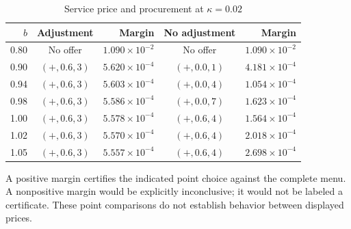 \begin{table}[tbp]
\centering
\caption{Service price and procurement at $\kappa=0.02$}\label{tab:r12_prices}
\begin{tabular}{rcrcr}
\toprule
$b$ & Adjustment & Margin & No adjustment & Margin \\
\midrule
0.80 & No offer & $1.090\times10^{-2}$ & No offer & $1.090\times10^{-2}$ \\
0.90 & $(+, 0.6, 3)$ & $5.620\times10^{-4}$ & $(+, 0.0, 1)$ & $4.181\times10^{-4}$ \\
0.94 & $(+, 0.6, 3)$ & $5.603\times10^{-4}$ & $(+, 0.0, 4)$ & $1.054\times10^{-4}$ \\
0.98 & $(+, 0.6, 3)$ & $5.586\times10^{-4}$ & $(+, 0.0, 7)$ & $1.623\times10^{-4}$ \\
1.00 & $(+, 0.6, 3)$ & $5.578\times10^{-4}$ & $(+, 0.6, 4)$ & $1.564\times10^{-4}$ \\
1.02 & $(+, 0.6, 3)$ & $5.570\times10^{-4}$ & $(+, 0.6, 4)$ & $2.018\times10^{-4}$ \\
1.05 & $(+, 0.6, 3)$ & $5.557\times10^{-4}$ & $(+, 0.6, 4)$ & $2.698\times10^{-4}$ \\
\bottomrule
\end{tabular}
\par\smallskip
{\footnotesize A positive margin certifies the indicated point choice against the complete menu. A nonpositive margin would be explicitly inconclusive; it would not be labeled a certificate. These point comparisons do not establish behavior between displayed prices.}
\end{table}
